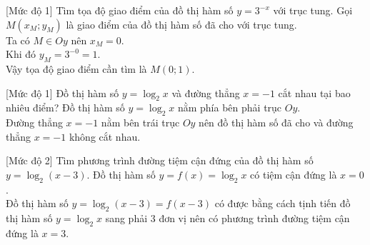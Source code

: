 \begin{bt}%
[Mức độ 1]%
Tìm tọa độ giao điểm của đồ thị hàm số $y=3^{-x}$ với trục tung.
\loigiai
{Gọi $M(x_M;y_M)$ là giao điểm của đồ thị hàm số đã cho với trục tung.\\
Ta có $M\in Oy$ nên $x_M=0$.\\
Khi đó $y_M=3^{-0}=1$.\\
Vậy tọa độ giao điểm cần tìm là $M(0;1)$.
}
\end{bt}

\begin{bt}%
[Mức độ 1]%
Đồ thị hàm số $y=\log_2 x$ và đường thẳng $x=-1$ cắt nhau tại bao nhiêu điểm?
\loigiai
{Đồ thị hàm số $y=\log_2 x$  nằm phía bên phải trục $Oy$.\\
Đường thẳng $x=-1$ nằm bên trái trục $Oy$ nên đồ thị hàm số đã cho và đường thẳng $x=-1$ không cắt nhau.
}
\end{bt}

\begin{bt}%
[Mức độ 2]%
Tìm phương trình đường tiệm cận đứng của đồ thị hàm số $y=\log_2 (x-3)$.
\loigiai
{Đồ thị hàm số $y=f(x)=\log_2 x$ có tiệm cận đứng là $x=0$.\\
Đồ thị hàm số $y=\log_2(x-3)=f(x-3)$ có được bằng cách tịnh tiến đồ thị hàm số $y=\log_2 x$ sang phải $3$ đơn vị nên có phương trình đường tiệm cận đứng là $x=3$.
}
\end{bt}

